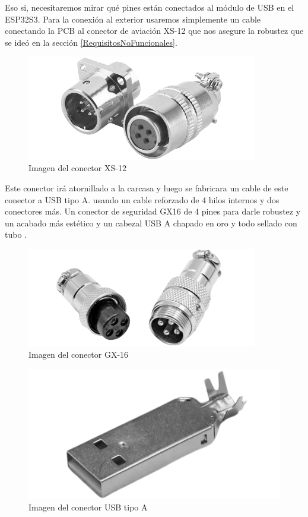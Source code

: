 Eso si, necesitaremos mirar qué pines están conectados al módulo de \gls{USB} en el ESP32S3. Para la conexión al exterior usaremos simplemente un cable conectando la \gls{PCB} al conector de aviación XS-12 que nos asegure la robustez que se ideó en la sección \ref{RequisitosNoFuncionales}.

\begin{figure}[H]
    \centering
    \includegraphics[width=0.9\textwidth]{imagenes/Capitulos/Cap03/XS12.png}
    \caption{Imagen del conector XS-12}
    \label{fig:XS12}
\end{figure}

Este conector irá atornillado a la carcasa y luego se fabricara un cable de este conector a \gls{USB} tipo A. usando un cable reforzado de 4 hilos internos y dos conectores más. Un conector de seguridad GX16 de 4 pines para darle robustez y un acabado más estético y un cabezal \gls{USB} A chapado en oro y todo sellado con tubo .

\begin{figure}[H]
    \centering
    \includegraphics[width=0.9\textwidth]{imagenes/Capitulos/Cap03/GX16.png}
    \caption{Imagen del conector GX-16}
    \label{fig:GX16}
\end{figure}

\begin{figure}[H]
    \centering
    \includegraphics[width=1\textwidth]{imagenes/Capitulos/Cap03/USBA.png}
    \caption{Imagen del conector \gls{USB} tipo A}
    \label{fig:USBA}
\end{figure}


